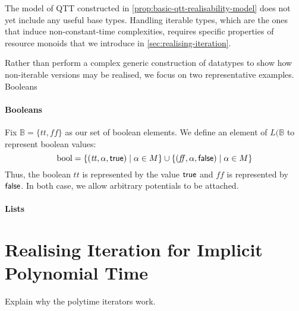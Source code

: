 \documentclass[acmsmall,review]{acmart}
\begin{document}
The model of QTT constructed in
\autoref{prop:basic-qtt-realisability-model} does not yet include any
useful base types. Handling iterable types, which are the ones that
induce non-constant-time complexities, requires specific properties of
resource monoids that we introduce in
\autoref{sec:realising-iteration}.

Rather than perform a complex generic construction of datatypes to
show how non-iterable versions may be realised, we focus on two
representative examples. Booleans

\paragraph{Booleans} Fix $\mathbb{B} = \{ \mathit{tt}, \mathit{ff} \}$
as our set of boolean elements. We define an element of $L(\mathbb{B}$
to represent boolean values:
\begin{displaymath}
  \mathrm{bool} = \{ (\mathit{tt}, \alpha, \mathsf{true}) \mid \alpha \in M \} \cup \{ (\mathit{ff}, \alpha, \mathsf{false}) \mid \alpha \in M \}
\end{displaymath}
Thus, the boolean $\mathit{tt}$ is represented by the value $\mathsf{true}$
and $\mathit{ff}$ is represented by $\mathsf{false}$. In both case, we
allow arbitrary potentials to be attached.



\paragraph{Lists}

\section{Realising Iteration for Implicit Polynomial Time}
\label{sec:realising-iteration}

Explain why the polytime iterators work.

\begin{theorem}
  \label{thm:cons-free-soundness}
\end{theorem}

\begin{theorem}
  \label{thm:lfpl-soundness}
\end{theorem}
\end{document}

